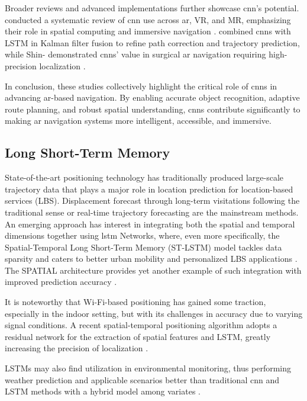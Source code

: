 \begin{refsection}
Broader reviews and advanced implementations further showcase \gls{cnn}'s potential. \citeauthor{nineteen} \citeyear{nineteen} conducted a systematic review of \gls{cnn} use across \gls{ar}, VR, and MR, emphasizing their role in spatial computing and immersive navigation \cite{nineteen}. \citeauthor{twentyfour} \citeyear{twentyfour} combined \gls{cnn}s with LSTM in Kalman filter fusion to refine path correction and trajectory prediction, while Shin-\citeauthor{twentythree} \citeyear{twentythree} demonstrated \gls{cnn}s' value in surgical \gls{ar} navigation requiring high-precision localization \cite{twentyfour, twentythree}.

In conclusion, these studies collectively highlight the critical role of \gls{cnn}s in advancing \gls{ar}-based navigation. By enabling accurate object recognition, adaptive route planning, and robust spatial understanding, \gls{cnn}s contribute significantly to making \gls{ar} navigation systems more intelligent, accessible, and immersive.

\subsection{Long Short-Term Memory}

State-of-the-art positioning technology has traditionally produced large-scale trajectory data that plays a major role in location prediction for location-based services (LBS). Displacement forecast through long-term visitations following the traditional sense or real-time trajectory forecasting are the mainstream methods. An emerging approach has interest in integrating both the spatial and temporal dimensions together using \gls{lstm} Networks, where, even more specifically, the Spatial-Temporal Long Short-Term Memory (ST-LSTM) model tackles data sparsity and caters to better urban mobility and personalized LBS applications \cite{twentysix}. The SPATIAL architecture provides yet another example of such integration with improved prediction accuracy \cite{twentyseven}.

It is noteworthy that Wi-Fi-based positioning has gained some traction, especially in the indoor setting, but with its challenges in accuracy due to varying signal conditions. A recent spatial-temporal positioning algorithm adopts a residual network for the extraction of spatial features and LSTM, greatly increasing the precision of localization \cite{twentyeight}.

LSTMs may also find utilization in environmental monitoring, thus performing weather prediction and applicable scenarios better than traditional \gls{cnn} and LSTM methods with a hybrid model among variates \cite{twentynine}.


\end{refsection}

